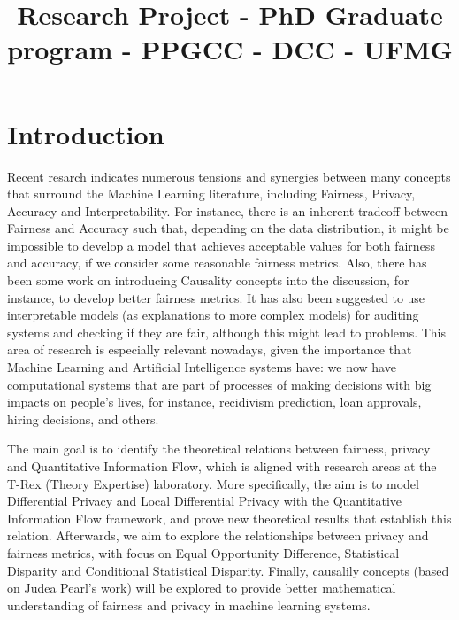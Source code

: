 \documentclass[12pt]{article}
\title{\Huge Research Project - PhD Graduate program - PPGCC - DCC - UFMG}
\date{}
\begin{document}
\maketitle
\vspace{-8em}

\section{Introduction}

Recent resarch\cite{Sok}\cite{Reductions}\cite{Rachel}\cite{Awareness} indicates numerous tensions and synergies between many concepts that surround the Machine Learning literature, including Fairness, Privacy, Accuracy and Interpretability. For instance, there is an inherent tradeoff between Fairness and Accuracy such that, depending on the data distribution, it might be impossible to develop a model that achieves acceptable values for both fairness and accuracy, if we consider some reasonable fairness metrics\cite{Carlos}. Also, there has been some work on introducing Causality concepts into the discussion, for instance, to develop better fairness metrics\cite{CausalFair}. It has also been suggested to use interpretable models (as explanations to more complex models) for auditing systems and checking if they are fair, although this might lead to problems\cite{ExplainAll}. This area of research is especially relevant nowadays, given the importance that Machine Learning and Artificial Intelligence systems have: we now have computational systems that are part of processes of making decisions with big impacts on people's lives, for instance, recidivism prediction\cite{Compass}, loan approvals\cite{Loans}, hiring decisions\cite{Jobs}, and others.

The main goal is to identify the theoretical relations between fairness, privacy and Quantitative Information Flow, which is aligned with research areas at the T-Rex (Theory Expertise) laboratory. More specifically, the aim is to model Differential Privacy and Local Differential Privacy with the Quantitative Information Flow framework, and prove new theoretical results that establish this relation. Afterwards, we aim to explore the relationships between privacy and fairness metrics, with focus on Equal Opportunity Difference, Statistical Disparity and Conditional Statistical Disparity. Finally, causalily concepts (based on Judea Pearl's work\cite{Causality}) will be explored to provide better mathematical understanding of fairness and privacy in machine learning systems.
\end{document}
